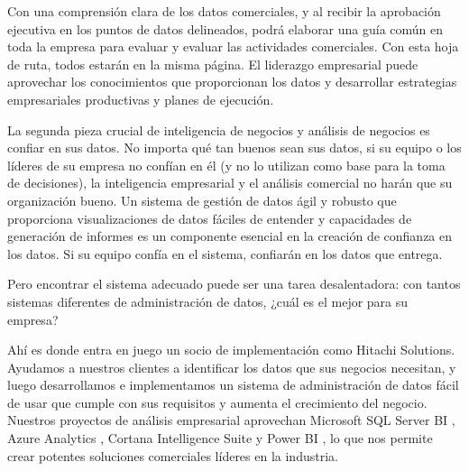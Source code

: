 \documentclass[12pt,a4paper]{report}
\begin{document}
Con una comprensión clara de los datos comerciales, y al recibir la aprobación ejecutiva en los puntos de datos delineados, podrá elaborar una guía común en toda la empresa para evaluar y evaluar las actividades comerciales. Con esta hoja de ruta, todos estarán en la misma página. El liderazgo empresarial puede aprovechar los conocimientos que proporcionan los datos y desarrollar estrategias empresariales productivas y planes de ejecución.    

La segunda pieza crucial de inteligencia de negocios y análisis de negocios es confiar en sus datos. No importa qué tan buenos sean sus datos, si su equipo o los líderes de su empresa no confían en él (y no lo utilizan como base para la toma de decisiones), la inteligencia empresarial y el análisis comercial no harán que su organización bueno. Un sistema de gestión de datos ágil y robusto que proporciona visualizaciones de datos fáciles de entender y capacidades de generación de informes es un componente esencial en la creación de confianza en los datos. Si su equipo confía en el sistema, confiarán en los datos que entrega.    

Pero encontrar el sistema adecuado puede ser una tarea desalentadora: con tantos sistemas diferentes de administración de datos, ¿cuál es el mejor para su empresa?

Ahí es donde entra en juego un socio de implementación como Hitachi Solutions. Ayudamos a nuestros clientes a identificar los datos que sus negocios necesitan, y luego desarrollamos e implementamos un sistema de administración de datos fácil de usar que cumple con sus requisitos y aumenta el crecimiento del negocio. Nuestros proyectos de análisis empresarial aprovechan Microsoft SQL Server BI , Azure Analytics , Cortana Intelligence Suite y Power BI , lo que nos permite crear potentes soluciones comerciales líderes en la industria.
\end{document}
